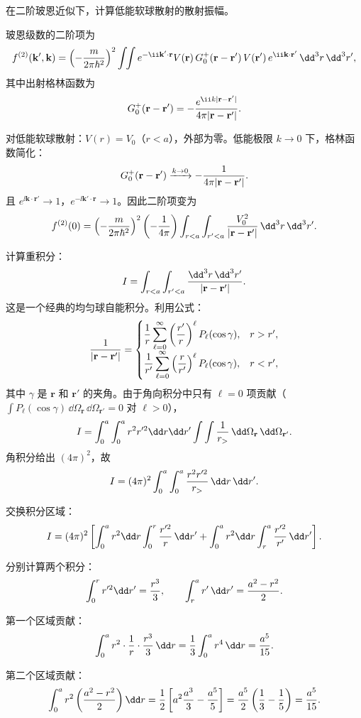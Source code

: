 \begin{question}
在二阶玻恩近似下，计算低能软球散射的散射振幅。
\end{question}
\begin{solution}
玻恩级数的二阶项为
\[
f^{(2)}(\mathbf k',\mathbf k)=\left(-{m\over2\pi\hbar^2}\right)^2
\int\!\!\int e^{-\ii\mathbf k'\cdot\mathbf r}
V(\mathbf r)\,G_0^+(\mathbf r-\mathbf r')\,V(\mathbf r')\,e^{\ii\mathbf k\cdot\mathbf r'}\,\dd^3r\,\dd^3r',
\]
其中出射格林函数为
\[
G_0^+(\mathbf r-\mathbf r')=-{e^{\ii k|\mathbf r-\mathbf r'|}\over4\pi|\mathbf r-\mathbf r'|}.
\]

对低能软球散射：$V(r)=V_0$（$r<a$），外部为零。低能极限 $k\to0$ 下，格林函数简化：
\[
G_0^+(\mathbf r-\mathbf r')\xrightarrow{k\to0}-{1\over4\pi|\mathbf r-\mathbf r'|}.
\]
且 $e^{\ii\mathbf k\cdot\mathbf r'}\to1$，$e^{-\ii\mathbf k'\cdot\mathbf r}\to1$。因此二阶项变为
\[
f^{(2)}(0)=\left(-{m\over2\pi\hbar^2}\right)^2\left(-{1\over4\pi}\right)
\int_{r<a}\int_{r'<a}{V_0^2\over|\mathbf r-\mathbf r'|}\,\dd^3r\,\dd^3r'.
\]

计算重积分：
\[
I=\int_{r<a}\int_{r'<a}{\dd^3r\,\dd^3r'\over|\mathbf r-\mathbf r'|}.
\]
这是一个经典的均匀球自能积分。利用公式：
\[
{1\over|\mathbf r-\mathbf r'|}=
\begin{cases}
\displaystyle{1\over r}\sum_{\ell=0}^{\infty}\left({r'\over r}\right)^\ell P_\ell(\cos\gamma), & r>r',\\[8pt]
\displaystyle{1\over r'}\sum_{\ell=0}^{\infty}\left({r\over r'}\right)^\ell P_\ell(\cos\gamma), & r<r',
\end{cases}
\]
其中 $\gamma$ 是 $\mathbf r$ 和 $\mathbf r'$ 的夹角。由于角向积分中只有 $\ell=0$ 项贡献（$\int P_\ell(\cos\gamma)\,\dd\Omega_{\mathbf r}\,\dd\Omega_{\mathbf r'}=0$ 对 $\ell>0$），
\[
I=\int_0^a\int_0^a r^2r'^2\dd r\dd r'\int\int{1\over r_>}\,\dd\Omega_{\mathbf r}\,\dd\Omega_{\mathbf r'}.
\]
角积分给出 $(4\pi)^2$，故
\[
I=(4\pi)^2\int_0^a\int_0^a{r^2r'^2\over r_>}\,\dd r\,\dd r'.
\]

交换积分区域：
\[
I=(4\pi)^2\left[\int_0^a r^2\dd r\int_0^r{r'^2\over r}\,\dd r'
+\int_0^a r^2\dd r\int_r^a{r'^2\over r'}\,\dd r'\right].
\]

分别计算两个积分：
\[
\int_0^r r'^2\dd r'={r^3\over3},\qquad
\int_r^a r'\,\dd r'={a^2-r^2\over2}.
\]

第一个区域贡献：
\[
\int_0^a r^2\cdot{1\over r}\cdot{r^3\over3}\,\dd r={1\over3}\int_0^a r^4\,\dd r={a^5\over15}.
\]

第二个区域贡献：
\[
\int_0^a r^2\left({a^2-r^2\over2}\right)\dd r
={1\over2}\left[a^2{a^3\over3}-{a^5\over5}\right]
={a^5\over2}\left({1\over3}-{1\over5}\right)={a^5\over15}.
\]


\end{solution}
